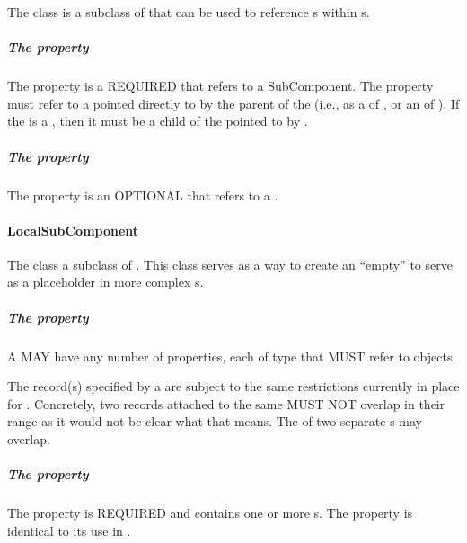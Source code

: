 The  class is a subclass of  that can be used to reference s within s. 

\subparagraph{The  property}\label{sec:inChildOf}

The  property is a REQUIRED  that refers to a SubComponent. The  property must refer to a  pointed directly to by the parent of the  (i.e., as a  of , or an  of ). If the  is a , then it must be a child of the  pointed to by .

\subparagraph{The  property}\label{sec:hasFeature:CR}

The  property is an OPTIONAL  that refers to a .

\paragraph{LocalSubComponent}
\label{sec:LocalSubComponent}

The  class a subclass of . This class serves as a way to create an ``empty''  to serve as a placeholder in more complex s.

\subparagraph{The  property}\label{sec:hasLocation:LSR}

A  MAY have any number of  properties, each of type  that MUST refer to  objects. 

The  record(s) specified by a  are subject to the same restrictions currently in place for  .
Concretely, two  records attached to the same  MUST NOT overlap in their range as it would not be clear what that means. The  of two separate s may overlap.

\subparagraph{The  property}\label{sec:type:LSC}

The  property is REQUIRED and contains one or more s. The  property is identical to its use in .

